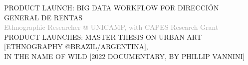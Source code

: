 \begin{cvtable}
%
	{
	}{
	 {\scriptsize PRODUCT LAUNCH: BIG DATA WORKFLOW FOR DIRECCIÓN GENERAL DE RENTAS} \\
        }  
% 
	{%
	\textcolor{darkgray}{%
    Ethnographic Researcher \newline
    @ {\scriptsize UNICAMP},
    with
    {C\scriptsize APES}
    Research Grant
	}}
	{
	}
	{
{\scriptsize PRODUCT LAUNCHES:
MASTER THESIS ON URBAN ART [ETHNOGRAPHY @BRAZIL/ARGENTINA], \\
IN THE NAME OF WILD [2022 DOCUMENTARY, BY PHILLIP VANNINI]
} \\
}
\end{cvtable}
